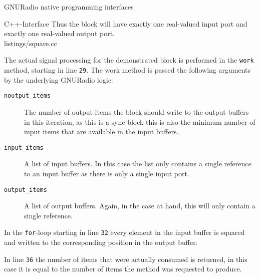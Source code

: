\begin{subchapter}{GNURadio native programming interfaces}
\begin{subsubchapter}{C++-Interface}
    Thus the block will have exactly one real-valued input port and exactly
    one real-valued output port. \\

    
                    {listings/square.cc}

    The actual signal processing for the demonstrated block
    is performed in the \texttt{work} method, starting in line
    \texttt{29}. The work method is passed the following arguments
    by the underlying GNURadio logic:

    \begin{description}
      \item[\texttt{noutput\_items}]
        The number of output items the block should write to the output
        buffers in this iteration, as this is a sync block this is also
        the minimum number of input items that are available in the input buffers.

      \item[\texttt{input\_items}]
        A list of input buffers. In this case the list only contains
        a single reference to an input buffer as there is only a
        single input port.

      \item[\texttt{output\_items}]
        A list of output buffers. Again, in the case at hand,
        this will only contain a single reference.
    \end{description}
  \end{subsubchapter}

  In the \texttt{for}-loop starting in line \texttt{32}
  every element in the input buffer is squared and written to
  the corresponding position in the output buffer.

  In line \texttt{36} the number of items that were actually consumed
  is returned, in this case it is equal to the number of items
  the method was requested to produce.
\end{subchapter}
